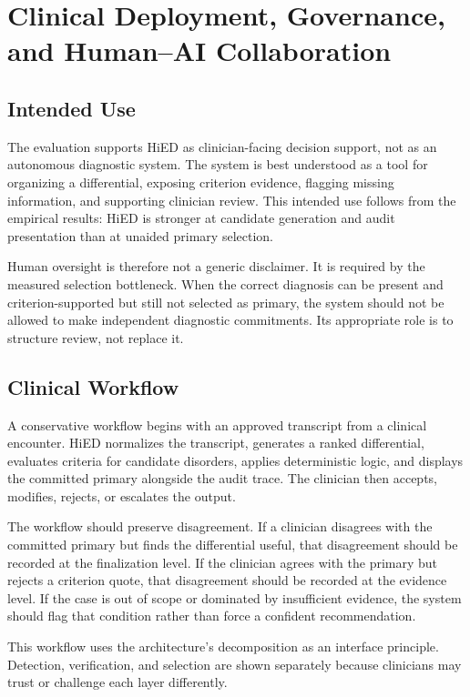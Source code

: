 \chapter{Clinical Deployment, Governance, and Human--AI Collaboration}
\label{ch:deployment}

\section{Intended Use}

The evaluation supports HiED as clinician-facing decision support, not as an autonomous diagnostic system. The system is best understood as a tool for organizing a differential, exposing criterion evidence, flagging missing information, and supporting clinician review. This intended use follows from the empirical results: HiED is stronger at candidate generation and audit presentation than at unaided primary selection.

Human oversight is therefore not a generic disclaimer. It is required by the measured selection bottleneck. When the correct diagnosis can be present and criterion-supported but still not selected as primary, the system should not be allowed to make independent diagnostic commitments. Its appropriate role is to structure review, not replace it.

\section{Clinical Workflow}

A conservative workflow begins with an approved transcript from a clinical encounter. HiED normalizes the transcript, generates a ranked differential, evaluates criteria for candidate disorders, applies deterministic logic, and displays the committed primary alongside the audit trace. The clinician then accepts, modifies, rejects, or escalates the output.

The workflow should preserve disagreement. If a clinician disagrees with the committed primary but finds the differential useful, that disagreement should be recorded at the finalization level. If the clinician agrees with the primary but rejects a criterion quote, that disagreement should be recorded at the evidence level. If the case is out of scope or dominated by insufficient evidence, the system should flag that condition rather than force a confident recommendation.

This workflow uses the architecture's decomposition as an interface principle. Detection, verification, and selection are shown separately because clinicians may trust or challenge each layer differently.


